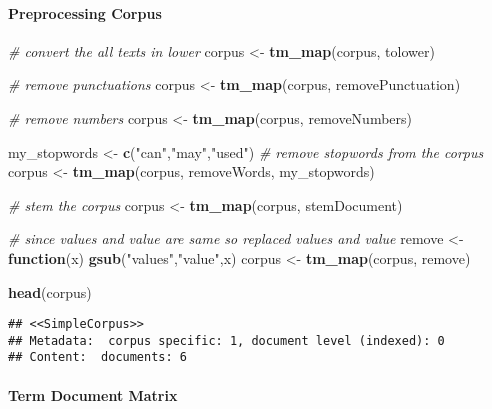 \documentclass[
]{article}
\newenvironment{Shaded}{\begin{snugshade}}{\end{snugshade}}
\newcommand{\CommentTok}[1]{\textcolor[rgb]{0.56,0.35,0.01}{\textit{#1}}}
\newcommand{\ControlFlowTok}[1]{\textcolor[rgb]{0.13,0.29,0.53}{\textbf{#1}}}
\newcommand{\FunctionTok}[1]{\textcolor[rgb]{0.13,0.29,0.53}{\textbf{#1}}}
\newcommand{\NormalTok}[1]{#1}
\newcommand{\OtherTok}[1]{\textcolor[rgb]{0.56,0.35,0.01}{#1}}
\newcommand{\StringTok}[1]{\textcolor[rgb]{0.31,0.60,0.02}{#1}}
\begin{document}
\hypertarget{preprocessing-corpus}{%
\paragraph{Preprocessing Corpus}\label{preprocessing-corpus}}

\begin{Shaded}
\begin{Highlighting}[]
\CommentTok{\# convert the all texts in lower}
\NormalTok{corpus }\OtherTok{\textless{}{-}} \FunctionTok{tm\_map}\NormalTok{(corpus, tolower)}

\CommentTok{\# remove punctuations}
\NormalTok{corpus }\OtherTok{\textless{}{-}} \FunctionTok{tm\_map}\NormalTok{(corpus, removePunctuation)}

\CommentTok{\# remove numbers}
\NormalTok{corpus }\OtherTok{\textless{}{-}} \FunctionTok{tm\_map}\NormalTok{(corpus, removeNumbers)}

\NormalTok{my\_stopwords }\OtherTok{\textless{}{-}} \FunctionTok{c}\NormalTok{(}\StringTok{"can"}\NormalTok{,}\StringTok{"may"}\NormalTok{,}\StringTok{"used"}\NormalTok{)}
\CommentTok{\# remove stopwords from the corpus}
\NormalTok{corpus }\OtherTok{\textless{}{-}} \FunctionTok{tm\_map}\NormalTok{(corpus, removeWords, my\_stopwords)}

\CommentTok{\# stem the corpus}
\NormalTok{corpus }\OtherTok{\textless{}{-}} \FunctionTok{tm\_map}\NormalTok{(corpus, stemDocument)}

\CommentTok{\# since values and value are same so replaced values and value}
\NormalTok{remove }\OtherTok{\textless{}{-}} \ControlFlowTok{function}\NormalTok{(x) }\FunctionTok{gsub}\NormalTok{(}\StringTok{"values"}\NormalTok{,}\StringTok{"value"}\NormalTok{,x)}
\NormalTok{corpus }\OtherTok{\textless{}{-}}  \FunctionTok{tm\_map}\NormalTok{(corpus, remove)}

\FunctionTok{head}\NormalTok{(corpus)}
\end{Highlighting}
\end{Shaded}

\begin{verbatim}
## <<SimpleCorpus>>
## Metadata:  corpus specific: 1, document level (indexed): 0
## Content:  documents: 6
\end{verbatim}

\hypertarget{term-document-matrix}{%
\paragraph{Term Document Matrix}\label{term-document-matrix}}
\end{document}
